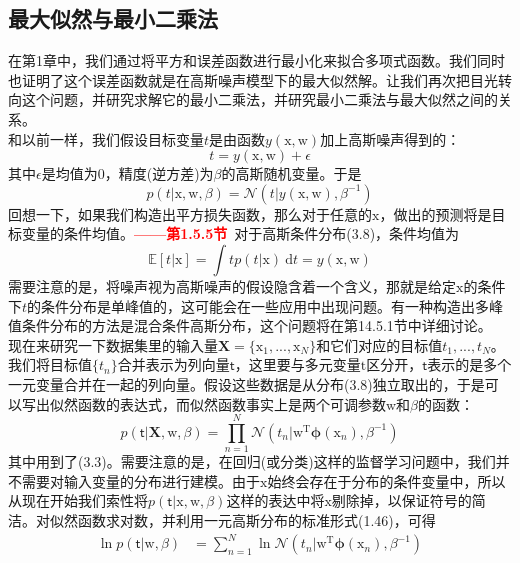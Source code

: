 \documentclass[b5paper]{book}
\numberwithin{equation}{chapter}
\newcommand {\bx} {\boldsymbol{\mathrm{x}}}
\newcommand {\bw} {\boldsymbol{\mathrm{w}}}
\newcommand {\sft} {\boldsymbol{\mathsf{t}}}
\newcommand {\rmT} {\mathrm{T}}
\newcommand {\rmd} {\mathrm{d}}
\newcommand {\bfphi} {\boldsymbol{\phi}}
\newcommand {\calN} {\mathcal{N}}
\begin{document}
	\subsection{最大似然与最小二乘法}
	\textnormal{
	在第1章中，我们通过将平方和误差函数进行最小化来拟合多项式函数。我们同时也证明了这个误差函数就是在高斯噪声模型下的最大似然解。让我们再次把目光转向这个问题，并研究求解它的最小二乘法，并研究最小二乘法与最大似然之间的关系。\\
	\indent 和以前一样，我们假设目标变量$t$是由函数$y(\bx,\bw)$加上高斯噪声得到的：
	\begin{equation}
		t=y(\bx,\bw)+\epsilon
	\end{equation}
	其中$\epsilon$是均值为0，精度(逆方差)为$\beta$的高斯随机变量。于是
	\begin{equation}
		p(t|\bx,\bw,\beta)=\calN(t|y(\bx,\bw),\beta^{-1})
	\end{equation}
	回想一下，如果我们构造出平方损失函数，那么对于任意的$\bx$，做出的预测将是目标变量的条件均值。\textcolor{red}{\textbf{——第1.5.5节}}\ 对于高斯条件分布(3.8)，条件均值为
	\begin{equation}
		\mathbb{E}[t|\bx]=\int tp(t|\bx)\ \rmd t = y(\bx,\bw)
	\end{equation}
	需要注意的是，将噪声视为高斯噪声的假设隐含着一个含义，那就是给定$\bx$的条件下$t$的条件分布是单峰值的，这可能会在一些应用中出现问题。有一种构造出多峰值条件分布的方法是混合条件高斯分布，这个问题将在第14.5.1节中详细讨论。\\
	\indent 现在来研究一下数据集里的输入量$\mathbf{X}=\{\bx_1,...,\bx_N\}$和它们对应的目标值$t_1,...,t_N$。我们将目标值$\{t_n\}$合并表示为列向量$\sft$，这里要与多元变量$\mathrm{t}$区分开，$\sft$表示的是多个一元变量合并在一起的列向量。假设这些数据是从分布(3.8)独立取出的，于是可以写出似然函数的表达式，而似然函数事实上是两个可调参数$\bw$和$\beta$的函数：
	\begin{equation}
		p(\sft|\mathbf{X},\bw,\beta)=\prod_{n=1}^N \calN (t_n|\bw^{\rmT}\bfphi(\bx_n),\beta^{-1})
	\end{equation}
	其中用到了(3.3)。需要注意的是，在回归(或分类)这样的监督学习问题中，我们并不需要对输入变量的分布进行建模。由于$\bx$始终会存在于分布的条件变量中，所以从现在开始我们索性将$p(\sft|\bx,\bw,\beta)$这样的表达中将$\bx$剔除掉，以保证符号的简洁。对似然函数求对数，并利用一元高斯分布的标准形式(1.46)，可得
	\begin{equation}
	\begin{split}
		\ln p(\sft|\bw,\beta) &= \sum_{n=1}^N \ln \calN (t_n|\bw^{\rmT} \bfphi(\bx_n),\beta^{-1}) \\

\end{split}
\end{equation}}
\end{document}
